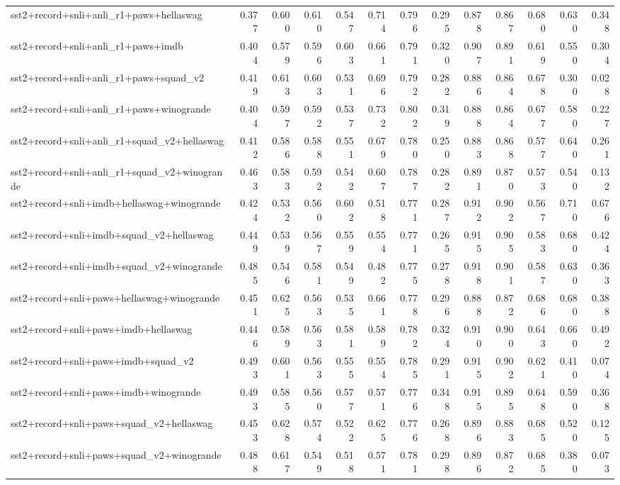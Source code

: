 \begin{table}[t]
\begin{tabular}{lrrrrrrrrrrrr}
    sst2+record+snli+anli\_r1+paws+hellaswag & 0.377 & 0.600 & 0.610 & 0.547 & 0.714 & 0.796 & 0.295 & 0.878 & 0.867 & 0.680 & 0.630 & 0.348 \\
    sst2+record+snli+anli\_r1+paws+imdb & 0.404 & 0.579 & 0.596 & 0.603 & 0.661 & 0.791 & 0.320 & 0.907 & 0.891 & 0.619 & 0.550 & 0.304 \\
    sst2+record+snli+anli\_r1+paws+squad\_v2 & 0.419 & 0.613 & 0.603 & 0.531 & 0.696 & 0.792 & 0.282 & 0.886 & 0.864 & 0.678 & 0.300 & 0.028 \\
    sst2+record+snli+anli\_r1+paws+winogrande & 0.404 & 0.597 & 0.592 & 0.537 & 0.732 & 0.802 & 0.319 & 0.888 & 0.864 & 0.677 & 0.580 & 0.227 \\
    sst2+record+snli+anli\_r1+squad\_v2+hellaswag & 0.412 & 0.586 & 0.588 & 0.551 & 0.679 & 0.780 & 0.250 & 0.883 & 0.868 & 0.577 & 0.640 & 0.261 \\
    sst2+record+snli+anli\_r1+squad\_v2+winogrande & 0.463 & 0.583 & 0.592 & 0.542 & 0.607 & 0.787 & 0.282 & 0.891 & 0.870 & 0.573 & 0.540 & 0.132 \\
    sst2+record+snli+imdb+hellaswag+winogrande & 0.424 & 0.532 & 0.560 & 0.602 & 0.518 & 0.771 & 0.287 & 0.912 & 0.902 & 0.567 & 0.710 & 0.676 \\
    sst2+record+snli+imdb+squad\_v2+hellaswag & 0.449 & 0.539 & 0.567 & 0.559 & 0.554 & 0.771 & 0.265 & 0.915 & 0.905 & 0.583 & 0.680 & 0.424 \\
    sst2+record+snli+imdb+squad\_v2+winogrande & 0.485 & 0.546 & 0.581 & 0.549 & 0.482 & 0.775 & 0.278 & 0.918 & 0.901 & 0.587 & 0.630 & 0.363 \\
    sst2+record+snli+paws+hellaswag+winogrande & 0.451 & 0.625 & 0.563 & 0.535 & 0.661 & 0.778 & 0.296 & 0.888 & 0.872 & 0.686 & 0.680 & 0.388 \\
    sst2+record+snli+paws+imdb+hellaswag & 0.446 & 0.589 & 0.563 & 0.581 & 0.589 & 0.782 & 0.324 & 0.910 & 0.900 & 0.643 & 0.660 & 0.492 \\
    sst2+record+snli+paws+imdb+squad\_v2 & 0.493 & 0.601 & 0.563 & 0.555 & 0.554 & 0.785 & 0.291 & 0.915 & 0.902 & 0.621 & 0.410 & 0.074 \\
    sst2+record+snli+paws+imdb+winogrande & 0.493 & 0.585 & 0.560 & 0.577 & 0.571 & 0.776 & 0.348 & 0.915 & 0.895 & 0.648 & 0.590 & 0.368 \\
    sst2+record+snli+paws+squad\_v2+hellaswag & 0.453 & 0.628 & 0.574 & 0.522 & 0.625 & 0.776 & 0.268 & 0.896 & 0.883 & 0.685 & 0.520 & 0.125 \\
    sst2+record+snli+paws+squad\_v2+winogrande & 0.488 & 0.617 & 0.549 & 0.518 & 0.571 & 0.781 & 0.298 & 0.896 & 0.872 & 0.685 & 0.380 & 0.073 \\

\end{tabular}
\end{table}
